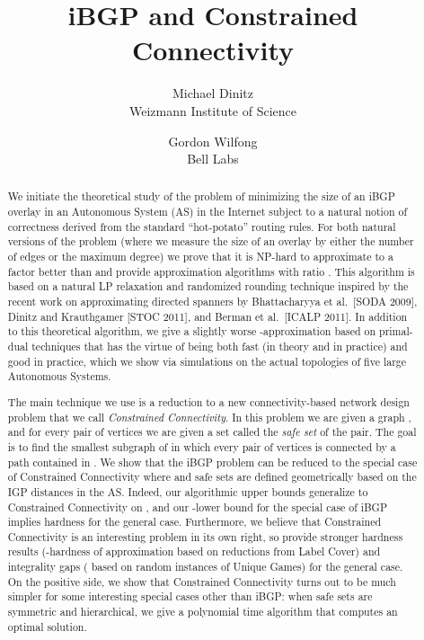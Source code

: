 \documentclass[11pt,letterpaper]{article}
\theoremstyle{definition}
\begin{document}
\title{iBGP and Constrained Connectivity}
\author{Michael Dinitz\\Weizmann Institute of Science \and Gordon Wilfong\\Bell Labs}

\begin{titlepage}
\maketitle
\thispagestyle{empty}

\begin{abstract}
We initiate the theoretical study of the problem of minimizing the size of an iBGP overlay in an Autonomous System (AS) in the Internet subject to a natural notion of correctness derived from the standard ``hot-potato'' routing rules.  For both natural versions of the problem (where we measure the size of an overlay by either the number of edges or the maximum degree) we prove that it is NP-hard to approximate to a factor better than  and provide approximation algorithms with ratio .  This algorithm is based on a natural LP relaxation and randomized rounding technique inspired by the recent work on approximating directed spanners by Bhattacharyya et al.~[SODA 2009], Dinitz and Krauthgamer [STOC 2011], and Berman et al.~[ICALP 2011].  In addition to this theoretical algorithm, we give a slightly worse -approximation based on primal-dual techniques that has the virtue of being both fast (in theory and in practice) and good in practice, which we show via simulations on the actual topologies of five large Autonomous Systems.

The main technique we use is a reduction to a new connectivity-based network design problem that we call \emph{Constrained Connectivity}.  In this problem we are given a graph , and for every pair of vertices  we are given a set  called the \emph{safe set} of the pair.  The goal is to find the smallest subgraph  of  in which every pair of vertices  is connected by a path contained in .  We show that the iBGP problem can be reduced to the special case of Constrained Connectivity where  and safe sets are defined geometrically based on the IGP distances in the AS.  Indeed, our algorithmic upper bounds generalize to Constrained Connectivity on , and our -lower bound for the special case of iBGP implies hardness for the general case.  Furthermore, we believe that Constrained Connectivity is an interesting problem in its own right, so provide stronger hardness results (-hardness of approximation based on reductions from Label Cover) and integrality gaps ( based on random instances of Unique Games) for the general case.  On the positive side, we show that Constrained Connectivity turns out to be much simpler for some interesting special cases other than iBGP: when safe sets are symmetric and hierarchical, we give a polynomial time algorithm that computes an optimal solution.
\end{abstract}

\end{titlepage}
\end{document}
